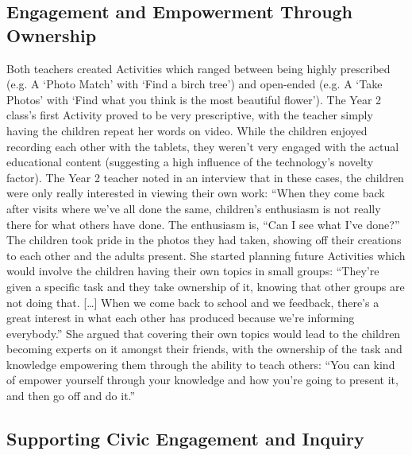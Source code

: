 \subsection{Engagement and Empowerment Through Ownership}

Both teachers created Activities which ranged between being highly prescribed
(e.g. A ‘Photo Match’ with ‘Find a birch tree’) and open-ended (e.g. A ‘Take
Photos’ with ‘Find what you think is the most beautiful flower’). The Year 2
class’s first Activity proved to be very prescriptive, with the teacher simply
having the children repeat her words on video. While the children enjoyed
recording each other with the tablets, they weren’t very engaged with the actual
educational content (suggesting a high influence of the technology’s novelty
factor). The Year 2 teacher noted in an interview that in these cases, the
children were only really interested in viewing their own work: “When they come
back after visits where we’ve all done the same, children’s enthusiasm is not
really there for what others have done. The enthusiasm is, “Can I see what I’ve
done?” The children took pride in the photos they had taken, showing off their
creations to each other and the adults present. She started planning future
Activities which would involve the children having their own topics in small
groups: “They’re given a specific task and they take ownership of it, knowing
that other groups are not doing that. […] When we come back to school and we
feedback, there’s a great interest in what each other has produced because we’re
informing everybody.” She argued that covering their own topics would lead to
the children becoming experts on it amongst their friends, with the ownership of
the task and knowledge empowering them through the ability to teach others: “You
can kind of empower yourself through your knowledge and how you’re going to
present it, and then go off and do it.”

\subsection{Supporting Civic Engagement and Inquiry}


